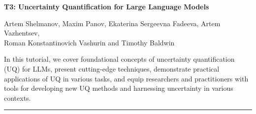 \begin{center}
    \Large{\textbf{T3: Uncertainty Quantification for Large Language Models}\\}
    \par\bigskip
    \large{Artem Shelmanov, Maxim Panov, Ekaterina Sergeevna Fadeeva, Artem Vazhentsev, \\
Roman Konstantinovich Vashurin and Timothy Baldwin}\\
    \par\bigskip

\end{center}

In this tutorial, we cover foundational concepts of uncertainty quantification (UQ) for LLMs, present cutting-edge techniques, demonstrate practical applications of UQ in various tasks, and equip researchers and practitioners with tools for developing new UQ methods and harnessing uncertainty in various contexts.
\begin{center}
    \noindent\rule{200px}{1pt}
\end{center}
